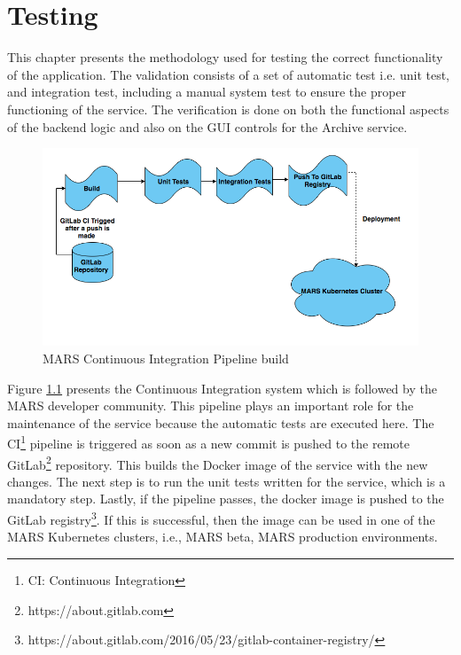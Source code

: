 \chapter{Testing}
\label{chap:testing}
This chapter presents the methodology used for testing the correct functionality of the application. The validation consists of a set of automatic test i.e.
unit test, and integration test, including a manual system test to ensure the proper functioning of the service. The verification is done on both the functional
aspects of the backend logic and also on the GUI controls for the Archive service.

\begin{figure}[H]
    \centering \includegraphics[scale=0.5]{grafiken/CIbuild.png}
    \caption{MARS Continuous Integration Pipeline build}
    \label{fig:CIbuild}
\end{figure}

Figure \ref{fig:CIbuild} presents the Continuous Integration system which is followed by the MARS developer community. This pipeline plays an important role
for the maintenance of the service because the automatic tests are executed here.
The CI\footnote{CI: Continuous Integration} pipeline is triggered as soon as a new commit is pushed to the remote 
GitLab\footnote{https://about.gitlab.com} repository. This builds the Docker image of the service with the new changes. The next step is to
run the unit tests written for the service, which is a mandatory step. Lastly, if the pipeline passes, the docker image is pushed
to the GitLab registry\footnote{https://about.gitlab.com/2016/05/23/gitlab-container-registry/}. If this is successful, then the image can be used in one of 
the MARS Kubernetes clusters, i.e., MARS beta, MARS production environments. 




